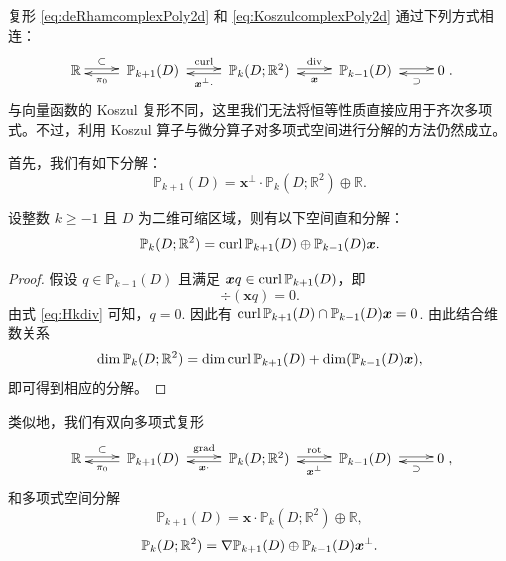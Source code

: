 复形 \eqref{eq:deRhamcomplexPoly2d} 和 \eqref{eq:KoszulcomplexPoly2d} 通过下列方式相连：
\begin{equation}\label{eq:deRhamcomplexPolydouble2d}
\xymatrix{
\mathbb R\ar@<0.4ex>[r]^-{\subset} & \; \mathbb P_{k+1}(D)\; \ar@<0.4ex>[r]^-{\curl}\ar@<0.4ex>[l]^-{\pi_0}  & \; \mathbb P_k(D;\mathbb R^2) \ar@<0.4ex>[r]^-{\div}\; \ar@<0.4ex>[l]^-{\boldsymbol x^{\bot}\cdot} & \; \mathbb P_{k-1}(D)  \; \ar@<0.4ex>[r]^-{} \ar@<0.4ex>[l]^-{\boldsymbol x}
& 0 \ar@<0.4ex>[l]^-{\supset} }.
\end{equation}
与向量函数的 Koszul 复形不同，这里我们无法将恒等性质直接应用于齐次多项式。不过，利用 Koszul 算子与微分算子对多项式空间进行分解的方法仍然成立。


首先，我们有如下分解：
\[
\mathbb P_{k+1}(D) = \boldsymbol x^{\perp}\cdot\mathbb P_k(D;\mathbb R^2)\oplus\mathbb R.
\]

\begin{lemma}\label{lem:symmpolyspacedirectsum}
设整数 $k \geq -1$ 且 $D$ 为二维可缩区域，则有以下空间直和分解：
 \begin{equation}\label{eq:vector2polyspacedecomp2}
\mathbb P_{k}(D;\mathbb R^2)=\operatorname{curl}\mathbb P_{k+1}(D)\oplus\mathbb P_{k-1}(D)\boldsymbol x.
\end{equation}
\end{lemma}
\begin{proof}
假设 $q\in\mathbb P_{k-1}(D)$ 且满足 $\boldsymbol xq\in\operatorname{curl}\mathbb P_{k+1}(D)$，即
\[
\div(\boldsymbol  xq)=0.
\]
由式 \eqref{eq:Hkdiv} 可知，$q=0$.
因此有
$\operatorname{curl}\mathbb P_{k+1}(D)\cap\mathbb P_{k-1}(D)\boldsymbol x=0$. 
由此结合维数关系
\[
\dim \mathbb P_k(D;\mathbb R^2) = \dim \operatorname{curl} \mathbb P_{k+1}(D) + \dim (\mathbb P_{k-1}(D)\boldsymbol x),
\]
即可得到相应的分解。
\end{proof}

类似地，我们有双向多项式复形
\begin{equation*}
\xymatrix{
\mathbb R\ar@<0.4ex>[r]^-{\subset} & \; \mathbb P_{k+1}(D)\; \ar@<0.4ex>[r]^-{\grad}\ar@<0.4ex>[l]^-{\pi_0}  & \; \mathbb P_k(D;\mathbb R^2) \ar@<0.4ex>[r]^-{\rot}\; \ar@<0.4ex>[l]^-{\boldsymbol x\cdot} & \; \mathbb P_{k-1}(D)  \; \ar@<0.4ex>[r]^-{} \ar@<0.4ex>[l]^-{\boldsymbol x^{\bot}}
& 0 \ar@<0.4ex>[l]^-{\supset} },
\end{equation*}
和多项式空间分解
\[
\mathbb P_{k+1}(D) = \boldsymbol x\cdot\mathbb P_k(D;\mathbb R^2)\oplus\mathbb R,
\]
\[
\mathbb P_{k}(D;\mathbb R^2)=\nabla\mathbb P_{k+1}(D)\oplus\mathbb P_{k-1}(D)\boldsymbol x^{\perp}.
\]


